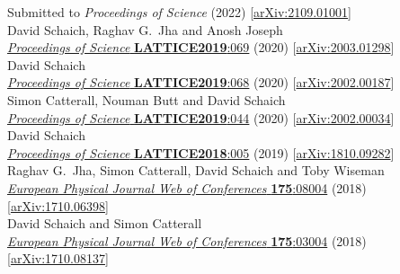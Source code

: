 \begin{spacelist}
\begin{revnumerate}
      Submitted to \textit{Proceedings of Science} (2022) [\href{http://arxiv.org/abs/2109.01001}{arXiv:2109.01001}]
    \pagebreakitem
       \\
      David Schaich, Raghav G.~Jha and Anosh Joseph \\
      \href{https://doi.org/10.22323/1.363.0069}{\textit{Proceedings of Science} \textbf{LATTICE2019}:069} (2020) [\href{http://arxiv.org/abs/2003.01298}{arXiv:2003.01298}]
    \pagebreakitem
       \\
      David Schaich \\
      \href{https://doi.org/10.22323/1.363.0068}{\textit{Proceedings of Science} \textbf{LATTICE2019}:068} (2020) [\href{http://arxiv.org/abs/2002.00187}{arXiv:2002.00187}]
    \pagebreakitem
       \\
      Simon Catterall, Nouman Butt and David Schaich \\
      \href{https://doi.org/10.22323/1.363.0044}{\textit{Proceedings of Science} \textbf{LATTICE2019}:044} (2020) [\href{http://arxiv.org/abs/2002.00034}{arXiv:2002.00034}]
    \pagebreakitem
       \\
      David Schaich \\
      \href{https://doi.org/10.22323/1.334.0005}{\textit{Proceedings of Science} \textbf{LATTICE2018}:005} (2019) [\href{http://arxiv.org/abs/1810.09282}{arXiv:1810.09282}]
    \pagebreakitem
       \\
      Raghav G.~Jha, Simon Catterall, David Schaich and Toby Wiseman \\
      \href{https://doi.org/10.1051/epjconf/201817508004}{\textit{European Physical Journal Web of Conferences} \textbf{175}:08004} (2018) [\href{http://arxiv.org/abs/1710.06398}{arXiv:1710.06398}]
    \pagebreakitem
       \\
      David Schaich and Simon Catterall \\
      \href{https://doi.org/10.1051/epjconf/201817503004}{\textit{European Physical Journal Web of Conferences} \textbf{175}:03004} (2018) [\href{http://arxiv.org/abs/1710.08137}{arXiv:1710.08137}]
    \pagebreakitem
       \\

\end{revnumerate}
\end{spacelist}
